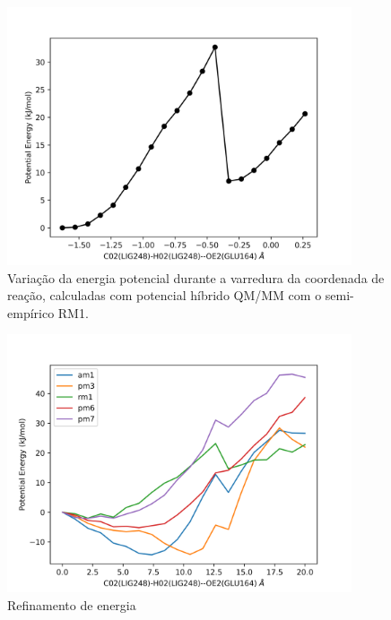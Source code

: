 \documentclass[a4paper,11pt]{refart}
\begin{document}
	\hspace*{-\leftmarginwidth}
	\begin{minipage}{\fullwidth}
		\begin{figure}[H]
			\begin{center}
				\includegraphics[width=4in]{ScanTraj}
				\caption{Variação da energia potencial durante a varredura da coordenada de reação, calculadas com potencial híbrido QM/MM com o semi-empírico RM1.}
				\label{scantraj}
			\end{center}
		\end{figure}
	\end{minipage}

	

	\hspace*{-\leftmarginwidth}
	\begin{minipage}{\fullwidth}
		\begin{figure}[H]
			\begin{center}
				\includegraphics[width=4in]{energy}
				\caption{Refinamento de energia}
				\label{mopac}
			\end{center}
		\end{figure}
	\end{minipage}
		
\end{document}
